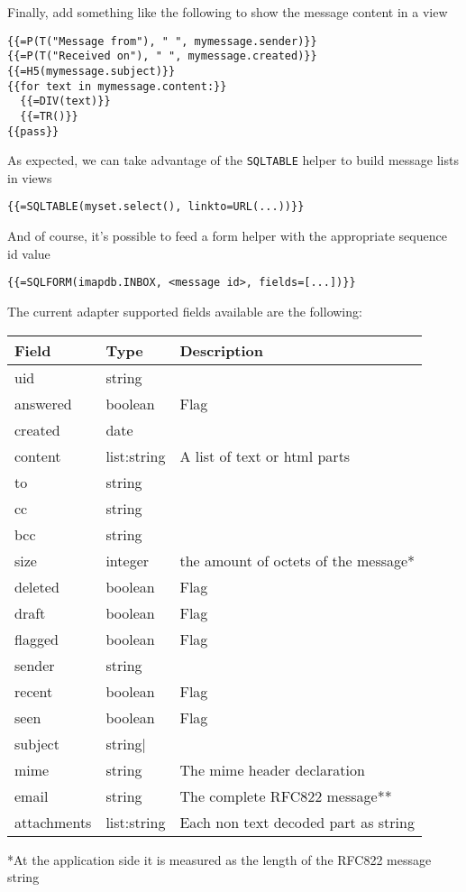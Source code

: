 \documentclass[justified,sixbynine,notoc]{tufte-book}
\def\ft{\small\tt}
\begin{document}
\begin{fullwidth}
Finally, add something like the following to show the message content in a view

\begin{lstlisting}[keywords={}]
{{=P(T("Message from"), " ", mymessage.sender)}}
{{=P(T("Received on"), " ", mymessage.created)}}
{{=H5(mymessage.subject)}}
{{for text in mymessage.content:}}
  {{=DIV(text)}}
  {{=TR()}}
{{pass}}
\end{lstlisting}

As expected, we can take advantage of the {\ft SQLTABLE} helper to build message lists in views

\begin{lstlisting}[keywords={}]
{{=SQLTABLE(myset.select(), linkto=URL(...))}}
\end{lstlisting}

And of course, it's possible to feed a form helper with the appropriate sequence id value

\begin{lstlisting}[keywords={}]
{{=SQLFORM(imapdb.INBOX, <message id>, fields=[...])}}
\end{lstlisting}

The current adapter supported fields available are the following:

\goodbreak\begin{center}
{\begin{tabular}{lll}\hline
{\bf Field} & {\bf Type} & {\bf Description}\\ \hline
uid & string & {\ft }\\
answered & boolean & Flag\\
created & date & {\ft }\\
content & list:string & A list of text or html parts\\
to & string & {\ft }\\
cc & string & {\ft }\\
bcc & string & {\ft }\\
size & integer & the amount of octets of the message*\\
deleted & boolean & Flag\\
draft & boolean & Flag\\
flagged & boolean & Flag\\
sender & string & {\ft }\\
recent & boolean & Flag\\
seen & boolean  & Flag\\
subject & string| {\ft }\\
mime & string & The mime header declaration\\
email & string & The complete RFC822 message**\\
attachments & list:string & Each non text decoded part as string \\ \hline
\end{tabular}}
\end{center}
*At the application side it is measured as the length of the RFC822
message string


\end{fullwidth}
\end{document}
